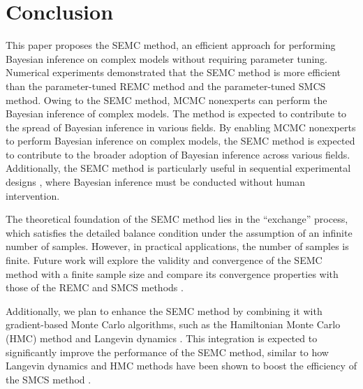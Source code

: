 \documentclass[12pt]{article}
\begin{document}
\section{Conclusion}
This paper proposes the SEMC method, an efficient approach for performing Bayesian inference on complex models without requiring parameter tuning.
Numerical experiments demonstrated that the SEMC method is more efficient than the parameter-tuned REMC method and the parameter-tuned SMCS method.
Owing to the SEMC method, MCMC nonexperts can perform the Bayesian inference of complex models. 
The method is expected to contribute to the spread of Bayesian inference in various fields.
By enabling MCMC nonexperts to perform Bayesian inference on complex models, the SEMC method is expected to contribute to the broader adoption of Bayesian inference across various fields. 
Additionally, the SEMC method is particularly useful in sequential experimental designs \cite{nabika2024bayesian}, where Bayesian inference must be conducted without human intervention. \par
The theoretical foundation of the SEMC method lies in the “exchange” process, which satisfies the detailed balance condition under the assumption of an infinite number of samples. 
However, in practical applications, the number of samples is finite. 
Future work will explore the validity and convergence of the SEMC method with a finite sample size and compare its convergence properties with those of the REMC and SMCS methods \cite{woodard2009sufficient,mathews2024finite}.\par

Additionally, we plan to enhance the SEMC method by combining it with gradient-based Monte Carlo algorithms, such as the Hamiltonian Monte Carlo (HMC) method \cite{neal2011mcmc} and Langevin dynamics \cite{roberts2002langevin}. 
This integration is expected to significantly improve the performance of the SEMC method, similar to how Langevin dynamics and HMC methods have been shown to boost the efficiency of the SMCS method \cite{arampatzis2018langevin,gunawan2020subsampling}.
  
\end{document}

